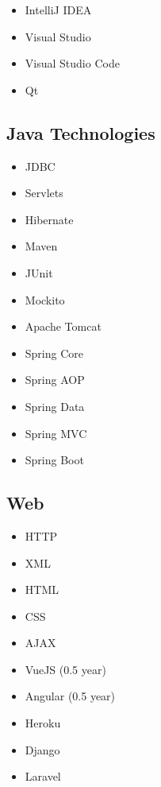 \documentclass[a4paper,12pt]{article}
\begin{document}
\begin{multicols}{2}
\begin{itemize}
    \item IntelliJ IDEA
    \item Visual Studio
    \item Visual Studio Code
    \item Qt
\end{itemize}
\end{multicols}

\subsection*{Java Technologies}

\begin{multicols}{3}
\begin{itemize}
    \item JDBC
    \item Servlets
    \item Hibernate
    \item Maven
    \item JUnit
    \item Mockito
    \item Apache Tomcat
    \item Spring Core 
    \item Spring AOP 
    \item Spring Data 
    \item Spring MVC 
    \item Spring Boot 
\end{itemize}
\end{multicols}

\subsection*{Web}

\begin{multicols}{2}
\begin{itemize}
    \item HTTP
    \item XML
    \item HTML
    \item CSS
    \item AJAX
    \item VueJS (0.5 year)
    \item Angular (0.5 year)
    \item Heroku
    \item Django
    \item Laravel 
\end{itemize}
\end{multicols}
\end{document}

